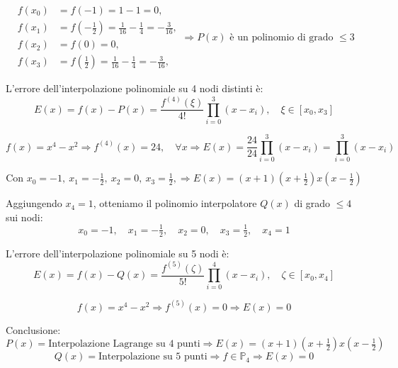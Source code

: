 \documentclass[12pt,a4paper]{article}
\begin{document}
\[
\begin{aligned}
f(x_0) &= f(-1) = 1 - 1 = 0, \\
f(x_1) &= f(-\tfrac{1}{2}) = \tfrac{1}{16} - \tfrac{1}{4} = -\tfrac{3}{16}, \\
f(x_2) &= f(0) = 0, \\
f(x_3) &= f(\tfrac{1}{2}) = \tfrac{1}{16} - \tfrac{1}{4} = -\tfrac{3}{16},
\end{aligned}
\Rightarrow P(x) \text{ è un polinomio di grado } \leq 3
\]

L'errore dell'interpolazione polinomiale su 4 nodi distinti è:
\[
E(x) = f(x) - P(x) = \frac{f^{(4)}(\xi)}{4!} \prod_{i=0}^3 (x - x_i), \quad \xi \in [x_0, x_3]
\]

\[
f(x) = x^4 - x^2 \Rightarrow f^{(4)}(x) = 24, \quad \forall x
\Rightarrow
E(x) = \frac{24}{24} \prod_{i=0}^3 (x - x_i) = \prod_{i=0}^3 (x - x_i)
\]

\[
\text{Con } x_0 = -1,\ x_1 = -\tfrac{1}{2},\ x_2 = 0,\ x_3 = \tfrac{1}{2}, \Rightarrow
E(x) = (x + 1)(x + \tfrac{1}{2})x(x - \tfrac{1}{2})
\]

\vspace{1em}
\noindent
Aggiungendo \( x_4 = 1 \), otteniamo il polinomio interpolatore \( Q(x) \) di grado \( \leq 4 \) sui nodi:
\[
x_0 = -1, \quad x_1 = -\tfrac{1}{2}, \quad x_2 = 0, \quad x_3 = \tfrac{1}{2}, \quad x_4 = 1
\]

L'errore dell'interpolazione polinomiale su 5 nodi è:
\[
E(x) = f(x) - Q(x) = \frac{f^{(5)}(\zeta)}{5!} \prod_{i=0}^4 (x - x_i), \quad \zeta \in [x_0, x_4]
\]

\[
f(x) = x^4 - x^2 \Rightarrow f^{(5)}(x) = 0 \Rightarrow E(x) = 0
\]

\vspace{1em}
\noindent
Conclusione:
\[
P(x) = \text{Interpolazione Lagrange su 4 punti} \Rightarrow E(x) = (x + 1)(x + \tfrac{1}{2})x(x - \tfrac{1}{2})
\]
\[
Q(x) = \text{Interpolazione su 5 punti} \Rightarrow f \in \mathbb{P}_4 \Rightarrow E(x) = 0
\]

\newpage
\noindent
{}
\vspace{1em}
\end{document}

